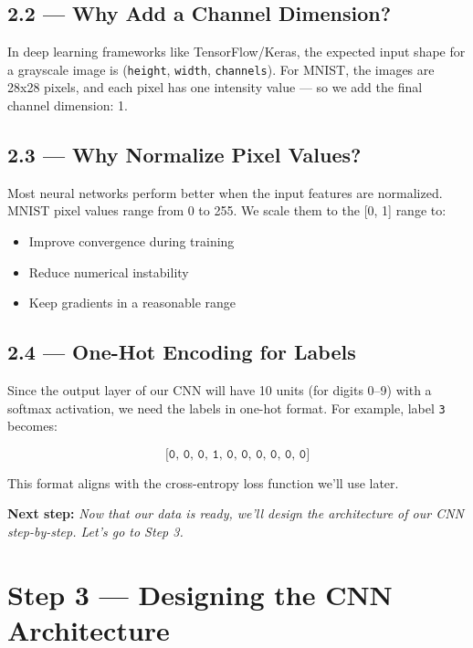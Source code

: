 \documentclass[11pt]{article}
\begin{document}
\subsection*{\textbf{2.2 — Why Add a Channel Dimension?}}

In deep learning frameworks like TensorFlow/Keras, the expected input shape for a grayscale image is (\texttt{height}, \texttt{width}, \texttt{channels}). For MNIST, the images are 28x28 pixels, and each pixel has one intensity value — so we add the final channel dimension: 1.

\subsection*{\textbf{2.3 — Why Normalize Pixel Values?}}

Most neural networks perform better when the input features are normalized. MNIST pixel values range from 0 to 255. We scale them to the [0, 1] range to:

\begin{itemize}
    \item Improve convergence during training
    \item Reduce numerical instability
    \item Keep gradients in a reasonable range
\end{itemize}

\subsection*{\textbf{2.4 — One-Hot Encoding for Labels}}

Since the output layer of our CNN will have 10 units (for digits 0–9) with a softmax activation, we need the labels in one-hot format. For example, label \texttt{3} becomes:

\[ \texttt{[0, 0, 0, 1, 0, 0, 0, 0, 0, 0]} \]

This format aligns with the cross-entropy loss function we'll use later.

\vspace{2em}
\noindent\textbf{\Large Next step:} \textit{Now that our data is ready, we’ll design the architecture of our CNN step-by-step. Let’s go to Step 3.}



\section*{Step 3 — Designing the CNN Architecture}
\end{document}
